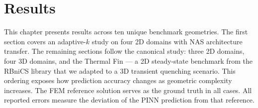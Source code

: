 \chapter{Results}
\label{chap:results}

This chapter presents results across ten unique benchmark geometries.
The first section covers an adaptive-$k$ study on four 2D domains with NAS
architecture transfer.
The remaining sections follow the canonical study: three 2D domains, four 3D
domains, and the Thermal Fin — a 2D steady-state benchmark from the RBniCS
library that we adapted to a 3D transient quenching scenario.
This ordering exposes how prediction accuracy changes as geometric complexity
increases.
The FEM reference solution serves as the ground truth in all cases.
All reported errors measure the deviation of the PINN prediction from that
reference.








 